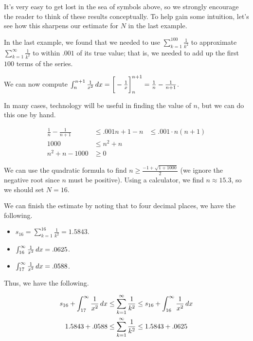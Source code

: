 \documentclass{ximera}
\begin{document}
It's very easy to get lost in the sea of symbols above, so we strongly encourage the reader to think of these results conceptually.  To help gain some intuition, let's see how this sharpens our estimate for $N$ in the last example.

\begin{example}
In the last example, we found that we needed to use $\sum_{k=1}^{100} \frac{1}{k^2}$ to approximate $\sum_{k=1}^{\infty} \frac{1}{k^2} $ to within $.001$ of its true value; that is, we needed to add up the first $100$ terms of the series.  

We can now compute $\int_n^{n+1} \frac{1}{x^2} \mathop{}\!d x  = \bigg[  -\frac{1}{x}  \bigg]_n^{n+1} = \frac{1}{n}-\frac{1}{n+1}$.

In many cases, technology will be useful in finding the value of $n$, but we can do this one by hand.

\begin{align*}
\frac{1}{n}-\frac{1}{n+1} &\leq .001
n+1 - n &\leq .001\cdot n(n+1) \\
1000 & \leq n^2+n \\
n^2+n-1000 &\geq 0
\end{align*}

We can use the quadratic formula to find $n \geq \frac{-1+\sqrt{1+1000}}{2}$ (we ignore the negative root since $n$ must be positive).  Using a calculator, we find $n \approx 15.3$, so we should set $N=16$.

We can finish the estimate by noting that to four decimal places, we have the following.

\begin{itemize}
\item $s_{16} = \sum_{k=1}^{16} \frac{1}{k^2} = 1.5843$.
\item $\int_{16}^\infty \frac{1}{x^2} \mathop{}\!d x = .0625$.
\item $\int_{17}^\infty \frac{1}{x^2} \mathop{}\!d x = .0588$.
\end{itemize}

Thus, we have the following.

\begin{align*}
s_{16} + \int_{17}^\infty \frac{1}{x^2} \mathop{}\!d x & \leq   \sum_{k=1}^{\infty} \frac{1}{k^2} \leq s_{16} + \int_{16}^\infty \frac{1}{x^2} \mathop{}\!d x \\
1.5843 + .0588 & \leq  \sum_{k=1}^{\infty} \frac{1}{k^2} \leq 1.5843 + .0625
\end{align*}


\end{example}
\end{document}

